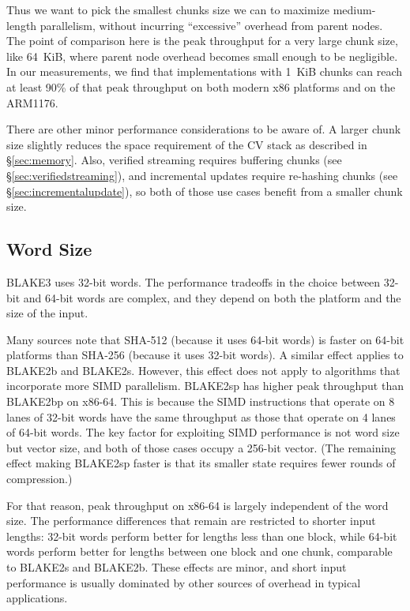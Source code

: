 \documentclass[11pt,notitlepage,a4paper]{article}
\begin{document}
Thus we want to pick the smallest chunks size we can to maximize medium-length
parallelism, without incurring ``excessive'' overhead from parent nodes. The
point of comparison here is the peak throughput for a very large chunk size,
like 64~KiB, where parent node overhead becomes small enough to be negligible.
In our measurements, we find that implementations with 1~KiB chunks can reach
at least 90\% of that peak throughput on both modern x86 platforms and on the
ARM1176.

There are other minor performance considerations to be aware of. A larger chunk
size slightly reduces the space requirement of the CV stack as described in
\S\ref{sec:memory}. Also, verified streaming requires buffering chunks (see
\S\ref{sec:verifiedstreaming}), and incremental updates require re-hashing
chunks (see \S\ref{sec:incrementalupdate}), so both of those use cases benefit
from a smaller chunk size.

\subsection{Word Size}\label{sec:wordsize}

BLAKE3 uses 32-bit words. The performance tradeoffs in the choice between
32-bit and 64-bit words are complex, and they depend on both the platform and
the size of the input.

Many sources note that SHA-512 (because it uses 64-bit words) is faster on
64-bit platforms than SHA-256 (because it uses 32-bit words). A similar effect
applies to BLAKE2b and BLAKE2s. However, this effect does not apply to
algorithms that incorporate more SIMD parallelism. BLAKE2sp has higher peak
throughput than BLAKE2bp on x86-64. This is because the SIMD instructions that
operate on 8 lanes of 32-bit words have the same throughput as those that
operate on 4 lanes of 64-bit words. The key factor for exploiting SIMD
performance is not word size but vector size, and both of those cases occupy a
256-bit vector. (The remaining effect making BLAKE2sp faster is that its
smaller state requires fewer rounds of compression.)

For that reason, peak throughput on x86-64 is largely independent of the word
size. The performance differences that remain are restricted to shorter input
lengths: 32-bit words perform better for lengths less than one block, while
64-bit words perform better for lengths between one block and one chunk,
comparable to BLAKE2s and BLAKE2b. These effects are minor, and short input
performance is usually dominated by other sources of overhead in typical
applications.
\end{document}
